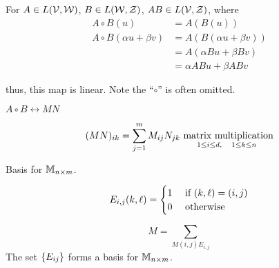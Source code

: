 For $A \in L(\mathcal{V}, \mathcal{W})$, $B \in L(\mathcal{W}, \mathcal{Z})$,
$AB \in L(\mathcal{V}, \mathcal{Z})$, where
\begin{align*}
    A\circ B(u)                             & = A(B(u))                                        \\
    A\circ B\left(\alpha u + \beta v\right) & = A\left(B\left(\alpha u + \beta v\right)\right) \\
                                            & = A\left(\alpha Bu + \beta Bv\right)             \\
                                            & = \alpha ABu + \beta ABv
\end{align*}

thus, this map is linear. Note the ``$\circ$'' is often omitted.

\begin{figure}
    \centering
\end{figure}

$A\circ B \leftrightarrow MN$

\[(MN)_{ik} = \sum_{j = 1}^m M_{ij}N_{jk} \underset{1 \leq i \leq d,\quad 1 \leq k \leq n}{\hbox{ matrix multiplication}}\]

Basis for $\mathbb{M}_{n\times m}$.

\[E_{i, j}(k, \ell) = \begin{cases}1 & \hbox{ if $(k, \ell) = (i, j)$}\\0 & \hbox{ otherwise}\end{cases}\]


\[M = \sum_{M(i, j)E_{i,j}}\]
The set $\left\lbrace E_{ij}\right\rbrace$ forms a basis for $\mathbb{M}_{n \times m}$.


